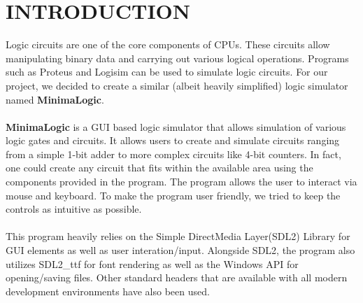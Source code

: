 \documentclass[report.tex]{subfiles}
\begin{document}
\newpage
\section{INTRODUCTION}
    Logic circuits are one of the core components of CPUs. These circuits allow manipulating binary data and carrying out various logical operations.
    Programs such as Proteus and Logisim can be used to simulate logic circuits.
    For our project, we decided to create a similar (albeit heavily simplified) logic simulator named \textbf{MinimaLogic}.
    \\\\
    \textbf{MinimaLogic} is a GUI based logic simulator that allows simulation of various logic gates and circuits.
    It allows users to create and simulate circuits ranging from a simple 1-bit adder to more complex circuits like 4-bit counters.
    In fact, one could create any circuit that fits within the available area using the components provided in the program.
    The program allows the user to interact via mouse and keyboard. To make the program user friendly, we tried to keep the controls as intuitive as possible.
    \\\\
    This program heavily relies on the Simple DirectMedia Layer(SDL2) Library for GUI elements as well as user interation/input. 
    Alongside SDL2, the program also utilizes SDL2\_ttf for font rendering as well as the Windows API for opening/saving files.
    Other standard headers that are available with all modern development environments have also been used.
\end{document}
